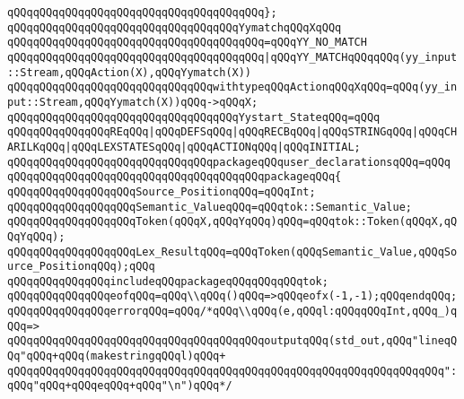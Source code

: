 \newline
\verb|qQQqqQQqqQQqqQQqqQQqqQQqqQQqqQQqqQQqqQQq};|\newline
\newline
\verb|qQQqqQQqqQQqqQQqqQQqqQQqqQQqqQQqqQQqYymatchqQQqXqQQq|\newline
\verb|qQQqqQQqqQQqqQQqqQQqqQQqqQQqqQQqqQQqqQQq=qQQqYY_NO_MATCH|\newline
\verb|qQQqqQQqqQQqqQQqqQQqqQQqqQQqqQQqqQQqqQQq|\verb#|qQQqYY_MATCHqQQqqQQq(yy_input::Stream,qQQqAction(X),qQQqYymatch(X))#\newline
\verb|qQQqqQQqqQQqqQQqqQQqqQQqqQQqqQQqwithtypeqQQqActionqQQqXqQQq=qQQq(yy_input::Stream,qQQqYymatch(X))qQQq->qQQqX;|\newline
\newline
\verb|qQQqqQQqqQQqqQQqqQQqqQQqqQQqqQQqqQQqYystart_StateqQQq=qQQq|\newline
\verb|qQQqqQQqqQQqqQQqREqQQq|\verb#|qQQqDEFSqQQq|qQQqRECBqQQq|qQQqSTRINGqQQq|qQQqCHARILKqQQq|qQQqLEXSTATESqQQq|qQQqACTIONqQQq|qQQqINITIAL;#\newline
\verb|qQQqqQQqqQQqqQQqqQQqqQQqqQQqqQQqpackageqQQquser_declarationsqQQq=qQQq|\newline
\verb|qQQqqQQqqQQqqQQqqQQqqQQqqQQqqQQqqQQqqQQqpackageqQQq{|\newline
\newline
\verb|qQQqqQQqqQQqqQQqqQQqSource_PositionqQQq=qQQqInt;|\newline
\verb|qQQqqQQqqQQqqQQqqQQqSemantic_ValueqQQq=qQQqtok::Semantic_Value;|\newline
\verb|qQQqqQQqqQQqqQQqqQQqToken(qQQqX,qQQqYqQQq)qQQq=qQQqtok::Token(qQQqX,qQQqYqQQq);|\newline
\verb|qQQqqQQqqQQqqQQqqQQqLex_ResultqQQq=qQQqToken(qQQqSemantic_Value,qQQqSource_PositionqQQq);qQQq|\newline
\newline
\verb|qQQqqQQqqQQqqQQqincludeqQQqpackageqQQqqQQqqQQqtok;|\newline
\newline
\verb|qQQqqQQqqQQqqQQqeofqQQq=qQQq\\qQQq()qQQq=>qQQqeofx(-1,-1);qQQqendqQQq;|\newline
\verb|qQQqqQQqqQQqqQQqerrorqQQq=qQQq/*qQQq\\qQQq(e,qQQql:qQQqqQQqInt,qQQq_)qQQq=>|\newline
\verb|qQQqqQQqqQQqqQQqqQQqqQQqqQQqqQQqqQQqqQQqoutputqQQq(std_out,qQQq"lineqQQq"qQQq+qQQq(makestringqQQql)qQQq+|\newline
\verb|qQQqqQQqqQQqqQQqqQQqqQQqqQQqqQQqqQQqqQQqqQQqqQQqqQQqqQQqqQQqqQQqqQQq":qQQq"qQQq+qQQqeqQQq+qQQq"\n")qQQq*/|\newline
